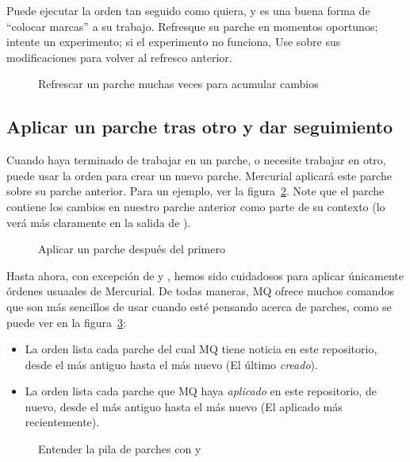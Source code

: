 Puede ejecutar la orden  tan seguido como quiera,
y es una buena forma de ``colocar marcas'' a su trabajo.  Refresque su
parche en momentos oportunos; intente un experimento; si el
experimento no funciona, Use  sobre sus modificaciones
para volver al refresco anterior.

\begin{figure}[ht]
  \caption{Refrescar un parche muchas veces para acumular cambios}
  \label{ex:mq:qrefresh2}
\end{figure}

\subsection{Aplicar un parche tras otro y dar seguimiento}

Cuando haya terminado de trabajar en un parche, o necesite trabajar en
otro, puede usar la orden  para crear un nuevo
parche.  Mercurial aplicará este parche sobre su parche anterior.
Para un ejemplo, ver la figura~\ref{ex:mq:qnew2}.  Note que el parche
contiene los cambios en nuestro parche anterior como parte de su
contexto (lo verá más claramente en la salida de ).

\begin{figure}[ht]
  \caption{Aplicar un parche después del primero}
  \label{ex:mq:qnew2}
\end{figure}

Hasta ahora, con excepción de  y
, hemos sido cuidadosos para aplicar únicamente
órdenes usuaales de Mercurial.  De todas maneras, MQ ofrece muchos
comandos que son más sencillos de usar cuando esté pensando acerca de
parches, como se puede ver en la figura~\ref{ex:mq:qseries}:

\begin{itemize}
\item La orden  lista cada parche del cual MQ
  tiene noticia en este repositorio, desde el más antiguo hasta el más
  nuevo (El último \emph{creado}).
\item La orden  lista cada parche que MQ haya
  \emph{aplicado} en este repositorio, de nuevo, desde el más antiguo
  hasta el más nuevo (El aplicado más recientemente).
\end{itemize}

\begin{figure}[ht]
  \caption{Entender la pila de parches con  y
    }
  \label{ex:mq:qseries}
\end{figure}

